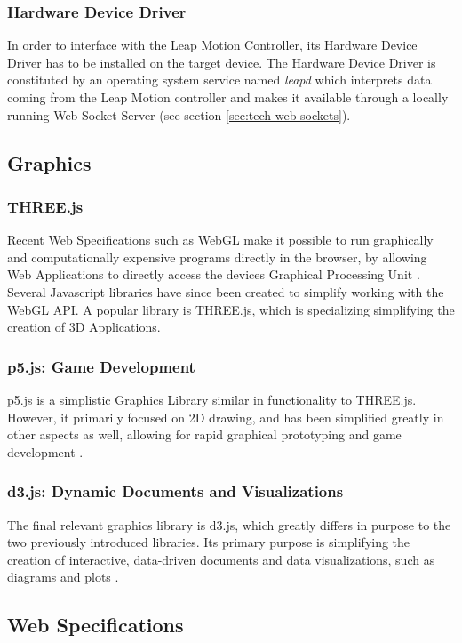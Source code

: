 \subsubsection{Hardware Device Driver}
In order to interface with the Leap Motion Controller, its Hardware Device Driver has to be installed on the target device. The Hardware Device Driver is constituted by an operating system service named \emph{leapd} which interprets data coming from the Leap Motion controller and makes it available through a locally running Web Socket Server (see section \ref{sec:tech-web-sockets}).
\subsection{Graphics}
\subsubsection{THREE.js}
Recent Web Specifications such as WebGL make it possible to run graphically and computationally expensive programs directly in the browser, by allowing Web Applications to directly access the devices Graphical Processing Unit \cite[sec. 1]{WebGl2Spec}. Several Javascript libraries have since been created to simplify working with the WebGL API. A popular library is THREE.js, which is specializing simplifying the creation of 3D Applications.
\subsubsection{p5.js: Game Development}
p5.js is a simplistic Graphics Library similar in functionality to THREE.js. However, it primarily focused on 2D drawing, and has been simplified greatly in other aspects as well, allowing for rapid graphical prototyping and game development \cite{P5JS}.
\subsubsection{d3.js: Dynamic Documents and Visualizations}
The final relevant graphics library is d3.js, which greatly differs in purpose to the two previously introduced libraries. Its primary purpose is simplifying the creation of interactive, data-driven documents and data visualizations, such as diagrams and plots \cite[preface]{zhu2013data}. 
\subsection{Web Specifications}
